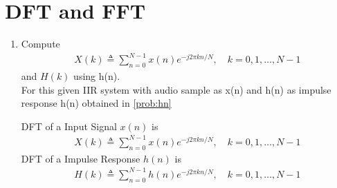 \documentclass[journal,12pt,twocolumn]{IEEEtran}
\renewcommand\thesection{\arabic{section}}
\begin{document}
\section{DFT and FFT}
\begin{enumerate}[label=\thesection.\arabic*
,ref=\thesection.\theenumi]
\item Compute
\begin{align}
        X(k) \triangleq \sum_{n=0}^{N-1} x(n) e^{-j 2 \pi k n / N}, \quad k=0,1, \ldots, N-1
\end{align}
and $H(k)$ using h(n).
\\
\solution
For this given IIR system with audio sample as x(n) and h(n) as impulse response h(n) obtained in \ref{prob:hn} 

DFT of a Input Signal $x(n)$ is 
\begin{align}
    X(k) \triangleq \sum_{n=0}^{N-1} x(n) e^{-j 2 \pi k n / N}, \quad k=0,1, \ldots, N-1
\end{align}
DFT of a Impulse Response $h(n)$ is 
\begin{align}
    H(k) \triangleq \sum_{n=0}^{N-1} h(n) e^{-j 2 \pi k n / N}, \quad k=0,1, \ldots, N-1
\end{align}


\end{enumerate}
\end{document}

